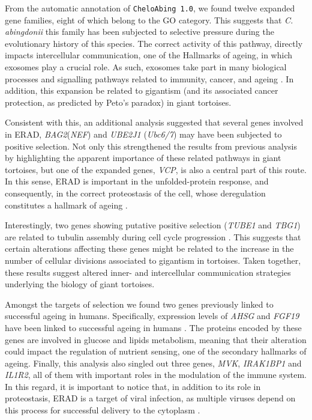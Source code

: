 From the automatic annotation of \texttt{CheloAbing 1.0}, we found twelve expanded gene families, eight of which belong to the  GO category. This suggests that \textit{C. abingdonii} this family has been subjected to selective pressure during the evolutionary history of this species.
The correct activity of this pathway, directly impacts intercellular communication, one of the Hallmarks of ageing, in which exosomes play a crucial role.
As such, exosomes take part in many biological processes and signalling pathways related to immunity, cancer, and ageing \cite{Baixauli2014,Becker2016,Prattichizzo2017}.
In addition, this expansion be related to gigantism (and its associated cancer protection, as predicted by Peto's paradox) in giant tortoises.

Consistent with this, an additional analysis suggested that several genes involved in ERAD, \textit{BAG2}(\textit{NEF}) and \textit{UBE2J1} (\textit{Ubc6/7}) may have been subjected to positive selection.
Not only this strengthened the results from previous analysis by highlighting the apparent importance of these related pathways in giant tortoises, but one of the expanded genes, \textit{VCP}, is also a central part of this route.
In this sense, ERAD is important in the unfolded-protein response, and consequently, in the correct proteostasis of the cell, whose deregulation constitutes a hallmark of ageing \cite{Lopez-Otin2013,Scheper2015}.

Interestingly, two genes showing putative positive selection (\textit{TUBE1} and \textit{TBG1}) are related to tubulin assembly during cell cycle progression \cite{Chinen2015}.
This suggests that certain alterations affecting these genes might be related to the increase in the number of cellular divisions associated to gigantism in tortoises.
Taken together, these results suggest altered inner- and intercellular communication strategies underlying the biology of giant tortoises.

Amongst the targets of selection we found two genes previously linked to successful ageing in humans.
Specifically, expression levels of \textit{AHSG} and \textit{FGF19} have been linked to successful ageing in humans \cite{Sanchis-Gomar2015}. 
The proteins encoded by these genes are involved in glucose and lipids metabolism, meaning that their alteration could impact the regulation of nutrient sensing, one of the secondary hallmarks of ageing.
Finally, this analysis also singled out three genes, \textit{MVK}, \textit{IRAK1BP1} and \textit{IL1R2}, all of them with important roles in the modulation of the immune system.
In this regard, it is important to notice that, in addition to its role in proteostasis, ERAD is a target of viral infection, as multiple viruses depend on this process for successful delivery to the cytoplasm \cite{Morito2015}.

